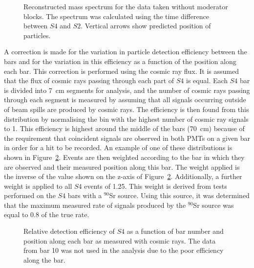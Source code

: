 \begin{figure}[ht]
  \centering
  \begin{adjustbox}{max totalsize={.9\textwidth}{.5\textheight},center}
    
  \end{adjustbox}
  \caption{Reconstructed mass spectrum for the data taken without moderator blocks. The spectrum was calculated using the time difference between $\mathit{S4}$ and $\mathit{S2}$. Vertical arrows show predicted position of particles.}
  \label{fig:s4tof_mass}
\end{figure}

A correction is made for the variation in particle detection efficiency between the bars and for the variation in this efficiency as a function of the position along each bar.
This correction is performed using the cosmic ray flux.
It is assumed that the flux of cosmic rays passing through each part of $\mathit{S4}$ is equal.
Each $\mathit{S4}$ bar is divided into 7~cm segments for analysis, and the number of cosmic rays passing through each segment is measured by assuming that all signals occurring outside of beam spills are produced by cosmic rays.
The efficiency is then found from this distribution by normalising the bin with the highest number of cosmic ray signals to 1.
This efficiency is highest around the middle of the bars (70~cm) because of the requirement that coincident signals are observed in both PMTs on a given bar in order for a hit to be recorded.
An example of one of these distributions is shown in Figure~\ref{fig:s4PosEff}.
Events are then weighted according to the bar in which they are observed and their measured position along this bar.
The weight applied is the inverse of the value shown on the z-axis of Figure~\ref{fig:s4PosEff}.
Additionally, a further weight is applied to all $\mathit{S4}$ events of 1.25.
This weight is derived from tests performed on the $\mathit{S4}$ bars with a $^{90}$Sr source.
Using this source, it was determined that the maximum measured rate of signals produced by the $^{90}$Sr source was equal to 0.8 of the true rate.

\begin{figure}
  \begin{adjustbox}{width=.68\textwidth, center}
    
  \end{adjustbox}
  \caption{Relative detection efficiency of $\mathit{S4}$ as a function of bar number and position along each bar as measured with cosmic rays. The data from bar 10 was not used in the analysis due to the poor efficiency along the bar.}
  \label{fig:s4PosEff}
\end{figure}

